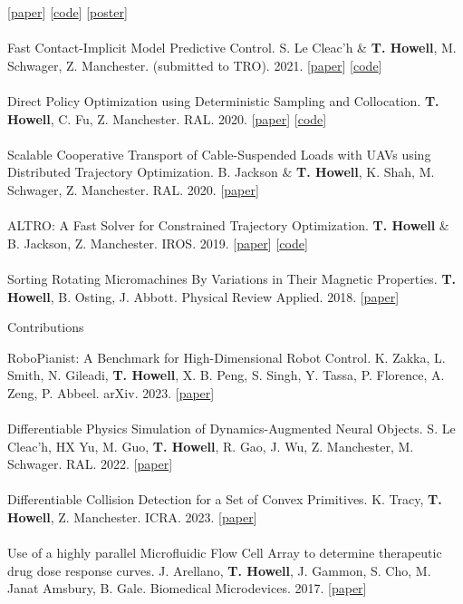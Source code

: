 \documentclass[10pt]{article}
\begin{document}
[\href{https://arxiv.org/abs/2109.04928}{paper}]
[\href{https://github.com/thowell/optimization_dynamics}{code}]
[\href{https://github.com/thowell/cv/blob/master/posters/optimization_dynamics_poster.pdf}{poster}]
\\
\\
Fast Contact-Implicit Model Predictive Control. S. Le Cleac'h \& \textbf{T. Howell}, M. Schwager, Z. Manchester. (submitted to TRO). 2021. 
[\href{https://arxiv.org/abs/2107.05616v2}{paper}]
[\href{https://github.com/thowell/ContactImplicitMPC.jl}{code}]
\\
\\
Direct Policy Optimization using Deterministic Sampling and Collocation. \textbf{T. Howell}, C. Fu, Z. Manchester. RAL. 2020. 
[\href{https://arxiv.org/abs/2010.08506v3}{paper}]
[\href{https://github.com/thowell/direct_policy_optimization}{code}]
\\
\\
Scalable Cooperative Transport of Cable-Suspended Loads with UAVs using Distributed Trajectory Optimization. B. Jackson \& \textbf{T. Howell}, K. Shah, M. Schwager, Z. Manchester. RAL. 2020. 
[\href{https://roboticexplorationlab.org/papers/distributed_quads.pdf}{paper}]
\\
\\
ALTRO: A Fast Solver for Constrained Trajectory Optimization. \textbf{T. Howell} \& B. Jackson, Z. Manchester. IROS. 2019. 
[\href{https://roboticexplorationlab.org/papers/altro-iros.pdf}{paper}]
[\href{https://github.com/RoboticExplorationLab/TrajectoryOptimization.jl}{code}]
\\
\\
Sorting Rotating Micromachines By Variations in Their Magnetic Properties. \textbf{T. Howell}, B. Osting, J. Abbott. Physical Review Applied. 2018. 
[\href{https://journals.aps.org/prapplied/pdf/10.1103/PhysRevApplied.9.054021}{paper}]
\\
\begin{center} Contributions \end{center}
RoboPianist: A Benchmark for High-Dimensional Robot Control. K. Zakka, L. Smith, N. Gileadi, \textbf{T. Howell}, X. B. Peng, S. Singh, Y. Tassa, P. Florence, A. Zeng, P. Abbeel. arXiv. 2023. 
[\href{https://arxiv.org/abs/2304.04150}{paper}]
\\
\\
Differentiable Physics Simulation of Dynamics-Augmented Neural Objects. S. Le Cleac'h, HX Yu, M. Guo, \textbf{T. Howell}, R. Gao, J. Wu, Z. Manchester, M. Schwager. RAL. 2022. 
[\href{https://arxiv.org/pdf/2210.09420.pdf}{paper}]
\\
\\
Differentiable Collision Detection for a Set of Convex Primitives. K. Tracy, \textbf{T. Howell}, Z. Manchester. ICRA. 2023.
[\href{https://arxiv.org/abs/2207.00669}{paper}]
\\
\\
Use of a highly parallel Microfluidic Flow Cell Array to determine therapeutic drug dose response curves. J. Arellano, \textbf{T. Howell}, J. Gammon, S. Cho, M. Janat Amsbury, B. Gale. Biomedical Microdevices. 2017. 
[\href{https://link.springer.com/article/10.1007/s10544-017-0166-3}{paper}]
\end{document}
